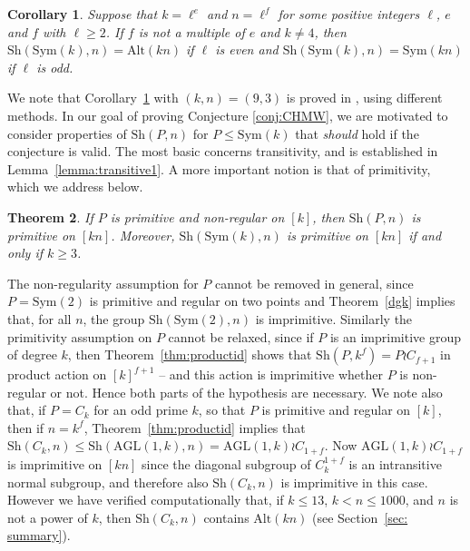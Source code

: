 \documentclass[12pt]{amsart}
\newtheorem{thm}{Theorem}[section]
\newtheorem{cor}[thm]{Corollary}
\theoremstyle{remark}
\theoremstyle{definition}
\newcommand{\sym}{\mathrm{Sym}}
\newcommand{\alt}{\mathrm{Alt}}
\newcommand{\sh}{\mathrm{Sh}}
\newcommand{\AGL}{\mathrm{AGL}}
\begin{document}
\begin{cor}
\label{cor:productid}
Suppose that $k=\ell^e$ and $n=\ell^f$ for some positive integers $\ell$, $e$ and $f$ with $\ell \geqslant 2$. If $f$ is not a multiple of $e$ and $k\neq 4$, then $\sh(\sym(k),n) = \alt(kn)$ if $\ell$ is even and $\sh(\sym(k),n) = \sym(kn)$ if $\ell$ is odd.
\end{cor}






We note  that Corollary~\ref{cor:productid} with $(k,n) = (9,3)$ is proved in \cite[Theorem 3.6]{CHMW}, using different methods.
%
In our goal of proving Conjecture \ref{conj:CHMW}, we are motivated to consider properties of  $\sh(P,n)$ for $P \leqslant \sym(k)$ that \emph{should} hold if the conjecture is valid. The most basic concerns transitivity, and is established in Lemma~\ref{lemma:transitive1}. A more important notion is that of primitivity, which we address below.

\begin{thm} \label{thm:prim}
If $P$ is primitive and non-regular on $[k]$, then $\sh(P,n)$ is primitive on $ [kn]$.
Moreover, $\sh(\sym(k),n)$ is primitive on $[kn]$ if and only if $k\geqslant3$.
\end{thm}

The non-regularity assumption for $P$ cannot be removed in general, since  $P=\sym(2)$ is primitive and regular on two points and Theorem~\ref{dgk} implies that, for all $n$, the group $\sh(\sym(2),n)$ is imprimitive. Similarly the primitivity assumption on $P$ cannot be relaxed, since if $P$ is an imprimitive group of degree $k$, then Theorem~\ref{thm:productid} shows that  $\sh(P,k^f) = P \wr C_{f+1}$   in product action on $[k]^{f+1}$  -- and this action is imprimitive whether $P$ is non-regular or not. Hence both parts of the hypothesis are necessary.  We note also that, if $P=C_k$ for an odd prime $k$, so that $P$ is primitive and regular on $[k]$, then if $n=k^f$, Theorem~\ref{thm:productid} implies that $\sh(C_k,n)\leqslant \sh(\AGL(1,k),n)=\AGL(1,k)\wr C_{1+f}$. Now $\AGL(1,k)\wr C_{1+f}$ is imprimitive on $[kn]$ since the diagonal subgroup of $C_k^{1+f}$ is an intransitive normal subgroup, and therefore also $\sh(C_k,n)$ is imprimitive in this case. However we have verified computationally that, if $k\leqslant 13$, $k<n\leqslant 1000$,
and $n$ is not a power of $k$, then $\sh(C_k,n)$ contains $\alt(kn)$ (see Section~\ref{sec: summary}). 
\end{document}
